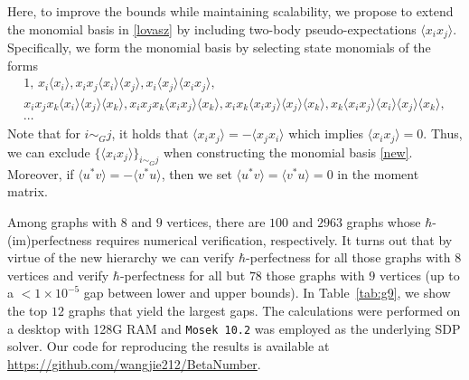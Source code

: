 Here, to improve the bounds while maintaining scalability, we propose to extend the monomial basis in \eqref{lovasz} by including two-body pseudo-expectations $\langle x_{i}x_{j}\rangle$.
Specifically, we form the monomial basis by selecting state monomials of the forms
\begin{gather}
1,\,x_{i}\langle x_{i}\rangle,x_{i}x_{j}\langle x_{i}\rangle\langle x_{j}\rangle,x_{i}\langle x_{j}\rangle\langle x_{i}x_{j}\rangle,\nonumber\\
x_{i}x_{j}x_{k}\langle x_{i}\rangle\langle x_{j}\rangle\langle x_{k}\rangle,x_{i}x_{j}x_{k}\langle x_{i}x_{j}\rangle\langle x_{k}\rangle,x_{i}x_{k}\langle x_{i}x_{j}\rangle\langle x_{j}\rangle\langle x_{k}\rangle,x_{k}\langle x_{i}x_{j}\rangle\langle x_{i}\rangle\langle x_{j}\rangle\langle x_{k}\rangle,\label{new}\\
\cdots\nonumber
\end{gather}
Note that for $i\sim_{G} j$, it holds that $\langle x_{i}x_{j}\rangle=-\langle x_{j}x_{i}\rangle$ which implies $\langle x_{i}x_{j}\rangle=0$. Thus, we can exclude $\{\langle x_{i}x_{j}\rangle\}_{i\sim_{G} j}$ when constructing the monomial basis \eqref{new}. Moreover, if $\langle u^*v\rangle=-\langle v^*u\rangle$, then we set $\langle u^*v\rangle=\langle v^*u\rangle=0$ in the moment matrix.


Among graphs with $8$ and $9$ vertices, there are $100$ and $2963$ graphs whose $\hbar$-(im)perfectness requires numerical verification, respectively. 
It turns out that by virtue of the new hierarchy we can verify $\hbar$-perfectness for all those graphs with $8$ vertices and verify $\hbar$-perfectness for all but $78$ those graphs with $9$ vertices (up to a $<1\times10^{-5}$ gap between lower and upper bounds). In Table~\ref{tab:g9}, we show the top $12$ graphs that yield the largest gaps. The calculations were performed on a desktop with 128G RAM and {\tt Mosek 10.2} was employed as the underlying SDP solver. Our code for reproducing the results is available at \url{https://github.com/wangjie212/BetaNumber}.

